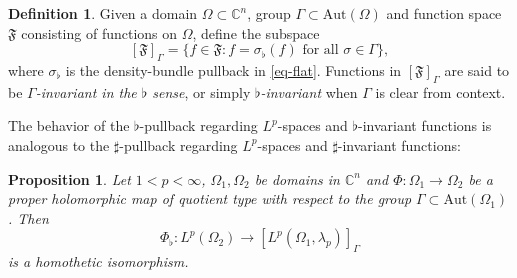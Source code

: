 \documentclass[letterpaper,11pt,reqno]{amsart}
\theoremstyle{plain}
\newtheorem{proposition}[equation]{Proposition}
\theoremstyle{definition}
\newtheorem{definition}[equation]{Definition}
\theoremstyle{remark}
\theoremstyle{remark}
\numberwithin{equation}{section}
\newcommand{\cx}{{\mathbb C}}
\newcommand{\C}{{\mathbb C}}
\begin{document}
\begin{definition}
Given a domain $\Omega\subset \cx^n$, group $\Gamma \subset \mathrm{Aut}(\Omega)$ and function space $\mathfrak{F}$ consisting of functions on $\Omega$, define the subspace
\begin{equation}\label{eq-gammainv2}
\left[\mathfrak{F}\right]_\Gamma = \{f\in \mathfrak{F} : f=  \sigma_\flat(f) \text{ for all } \sigma \in \Gamma \},
\end{equation}
where $\sigma_\flat$ is the density-bundle pullback in \eqref{eq-flat}.  
Functions in $\left[\mathfrak{F}\right]_\Gamma$ are said to be {\em $\Gamma$-invariant in the $\flat$ sense}, or simply {\em $\flat$-invariant} when $\Gamma$ is clear from context.
\end{definition}

The behavior of the $\flat$-pullback regarding $L^p$-spaces and $\flat$-invariant functions is analogous to the $\sharp$-pullback regarding $L^p$-spaces and $\sharp$-invariant functions:
 \begin{proposition}\label{P:Phi-flat-homot-isom}
Let $1<p<\infty$, $\Omega_1,\Omega_2$ be domains in $\C^n$ and $\Phi:\Omega_1 \to \Omega_2$ be a proper holomorphic map of quotient type with respect to the group $\Gamma \subset \mathrm{Aut}(\Omega_1)$.  Then
 \begin{equation}
\Phi_\flat:L^p(\Omega_2) \to \left[L^p(\Omega_1,\lambda_p)\right]_\Gamma
\end{equation}
is a homothetic isomorphism.
\end{proposition}
\end{document}
